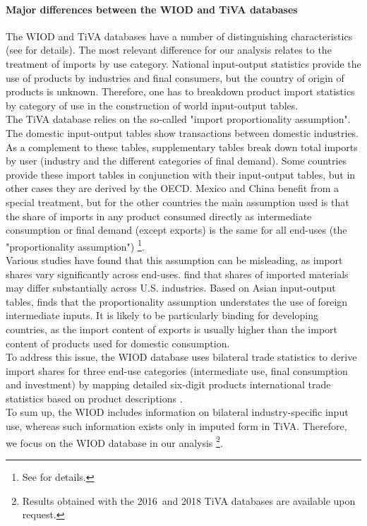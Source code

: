 \documentclass[11pt,a4paper]{article}
\begin{document}
\paragraph{Major differences between the WIOD and TiVA databases}
The WIOD and TiVA databases have a number of distinguishing characteristics (see \cite{Timmer2015} for details). The most relevant difference for our analysis relates to the treatment of imports by use category. National input-output statistics provide the use of products by industries and final consumers, but the country of origin of products is unknown. Therefore, one has to breakdown product import statistics by category of use in the construction of world input-output tables.\\
The TiVA database relies on the so-called "import proportionality assumption". The domestic input-output tables show transactions between domestic industries. As a complement to these tables, supplementary tables break down total imports by user (industry and the different categories of final demand). Some countries provide these import tables in conjunction with their input-output tables, but in other cases they are derived by the OECD. Mexico and China benefit from a special treatment, but for the other countries the main assumption used is that the share of imports in any product consumed directly as intermediate consumption or final demand (except exports) is the same for all end-uses (the "proportionality assumption") \footnote{See \cite{OECD2011} for details.}.\\
Various studies have found that this assumption can be misleading, as import shares vary significantly across end-uses. \cite{Feenstra2012} find that shares of imported materials may differ substantially across U.S. industries. Based on Asian input-output tables, \cite{Puzzello2012} finds that the proportionality assumption understates the use of foreign intermediate inputs. It is likely to be particularly binding for developing countries, as the import content of exports is usually higher than the import content of products used for domestic consumption.\\
To address this issue, the WIOD database uses bilateral trade statistics to derive import shares for three end-use categories (intermediate use, final consumption and investment) by mapping detailed six-digit products international trade statistics based on product descriptions \citep{Dietzenbacher2013}.\\
To sum up, the WIOD includes information on bilateral industry-specific input use, whereas such information exists only in imputed form in TiVA. Therefore, we focus on the WIOD database in our analysis \footnote{Results obtained with the 2016 and 2018 TiVA databases are available upon request.}. 
\end{document}
